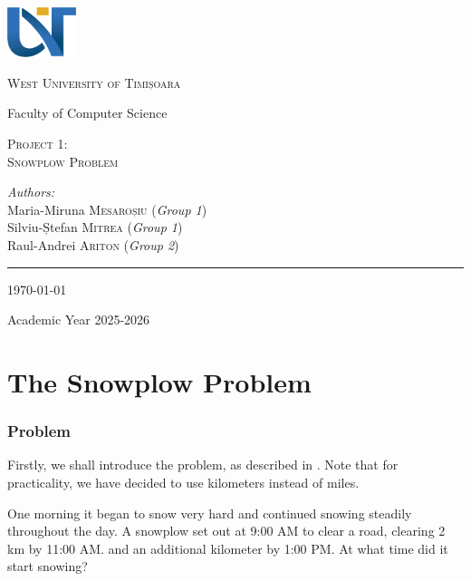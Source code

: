 \documentclass[a4paper,12pt]{article}
\begin{document}
\begin{titlepage}
	\vspace*{-3cm}
	\centering
		\includegraphics[width=2cm]{assets/uvt_logo_en.png}

	{\scshape\LARGE West University of Timișoara\par}

	\vspace{1cm}

	{\large Faculty of Computer Science}

	\vspace{.1\textheight}
	{ \LARGE \scshape Project 1: \\ Snowplow Problem \par}

		\vspace{.1\linewidth}

			{\emph{Authors:} \\
			Maria-Miruna \textsc{Mesaroșiu} (\textit{Group 1}) \\
            Silviu-Ștefan \textsc{Mitrea} (\textit{Group 1}) \\
            Raul-Andrei \textsc{Ariton} (\textit{Group 2})    
            }

			\vfill

			\rule{.4\textwidth}{.4pt}

	{\large \today\par
	Academic Year 2025-2026\par}
\end{titlepage}

\tableofcontents \newpage

\part{The Snowplow Problem} \label{firstpart}
\section{Problem}
    Firstly, we shall introduce the problem, as described in \cite[pp.~84--85]{Kent_Nagle2018-ig}. Note that for practicality, we have decided to use kilometers instead of miles.

    \begin{framed}
        \noindent One morning it began to snow very hard and continued snowing steadily throughout the day. A snowplow set out at 9:00 AM to clear a road, clearing 2 \unit{\kilo\meter} by 11:00 AM. and an additional kilometer by 1:00 PM. At what time did it start snowing?
    \end{framed}
    
\end{document}
